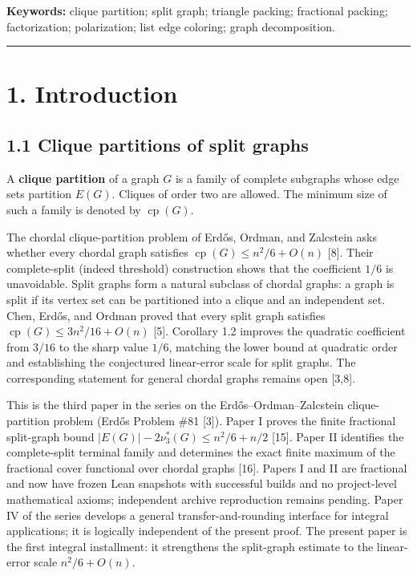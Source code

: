 \documentclass[
  american,
  11pt,
  a4paper,
]{article}
\begin{document}
\textbf{Keywords:} clique partition; split graph; triangle packing; fractional packing; factorization; polarization; list edge coloring; graph decomposition.

\begin{center}\rule{0.5\linewidth}{0.5pt}\end{center}

\section{1. Introduction}\label{introduction}

\subsection{1.1 Clique partitions of split graphs}\label{clique-partitions-of-split-graphs}

A \textbf{clique partition} of a graph \(G\) is a family of complete subgraphs whose edge sets partition \(E(G)\). Cliques of order two are allowed. The minimum size of such a family is denoted by \(\operatorname{cp}(G)\).

The chordal clique-partition problem of Erdős, Ordman, and Zalcstein asks whether every chordal graph satisfies \(\operatorname{cp}(G)\le n^2/6+O(n)\) {[}8{]}. Their complete-split (indeed threshold) construction shows that the coefficient \(1/6\) is unavoidable. Split graphs form a natural subclass of chordal graphs: a graph is split if its vertex set can be partitioned into a clique and an independent set. Chen, Erdős, and Ordman proved that every split graph satisfies \(\operatorname{cp}(G)\le 3n^2/16+O(n)\) {[}5{]}. Corollary 1.2 improves the quadratic coefficient from \(3/16\) to the sharp value \(1/6\), matching the lower bound at quadratic order and establishing the conjectured linear-error scale for split graphs. The corresponding statement for general chordal graphs remains open {[}3,8{]}.

This is the third paper in the series on the Erdős--Ordman--Zalcstein clique-partition problem (Erdős Problem \#81 {[}3{]}). Paper I proves the finite fractional split-graph bound \(|E(G)|-2\nu_3^*(G)\le n^2/6+n/2\) {[}15{]}. Paper II identifies the complete-split terminal family and determines the exact finite maximum of the fractional cover functional over chordal graphs {[}16{]}. Papers I and II are fractional and now have frozen Lean snapshots with successful builds and no project-level mathematical axioms; independent archive reproduction remains pending. Paper IV of the series develops a general transfer-and-rounding interface for integral applications; it is logically independent of the present proof. The present paper is the first integral installment: it strengthens the split-graph estimate to the linear-error scale \(n^2/6+O(n)\).
\end{document}
